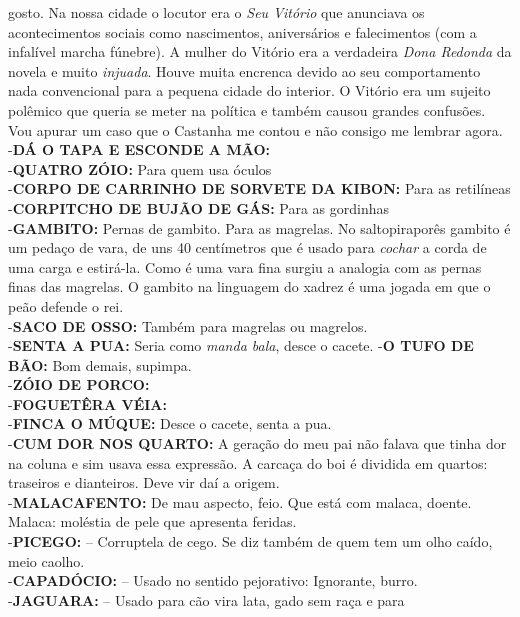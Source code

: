 \documentclass[12pt,brazil,]{book}
\begin{document}
\begin{itemize}
  gosto. Na nossa cidade o locutor era o \emph{Seu Vitório} que
  anunciava os acontecimentos sociais como nascimentos, aniversários e
  falecimentos (com a infalível marcha fúnebre). A mulher do Vitório era
  a verdadeira \emph{Dona Redonda} da novela e muito \emph{injuada}.
  Houve muita encrenca devido ao seu comportamento nada convencional
  para a pequena cidade do interior. O Vitório era um sujeito polêmico
  que queria se meter na política e também causou grandes confusões. Vou
  apurar um caso que o Castanha me contou e não consigo me lembrar
  agora.\\
  -\textbf{DÁ O TAPA E ESCONDE A MÃO:}\\
  -\textbf{QUATRO ZÓIO:} Para quem usa óculos\\
  -\textbf{CORPO DE CARRINHO DE SORVETE DA KIBON:} Para as retilíneas\\
  -\textbf{CORPITCHO DE BUJÃO DE GÁS:} Para as gordinhas\\
  -\textbf{GAMBITO:} Pernas de gambito. Para as magrelas. No
  saltopiraporês gambito é um pedaço de vara, de uns 40 centímetros que
  é usado para \emph{cochar} a corda de uma carga e estirá-la. Como é
  uma vara fina surgiu a analogia com as pernas finas das magrelas. O
  gambito na linguagem do xadrez é uma jogada em que o peão defende o
  rei.\\
  -\textbf{SACO DE OSSO:} Também para magrelas ou magrelos.\\
  -\textbf{SENTA A PUA:} Seria como \emph{manda bala}, desce o cacete.
  -\textbf{O TUFO DE BÃO:} Bom demais, supimpa.\\
  -\textbf{ZÓIO DE PORCO:}\\
  -\textbf{FOGUETÊRA VÉIA:}\\
  -\textbf{FINCA O MÚQUE:} Desce o cacete, senta a pua.\\
  -\textbf{CUM DOR NOS QUARTO:} A geração do meu pai não falava que
  tinha dor na coluna e sim usava essa expressão. A carcaça do boi é
  dividida em quartos: traseiros e dianteiros. Deve vir daí a origem.\\
  -\textbf{MALACAFENTO:} De mau aspecto, feio. Que está com malaca,
  doente. Malaca: moléstia de pele que apresenta feridas.\\
  -\textbf{PICEGO:} -- Corruptela de cego. Se diz também de quem tem um
  olho caído, meio caolho.\\
  -\textbf{CAPADÓCIO:} -- Usado no sentido pejorativo: Ignorante,
  burro.\\
  -\textbf{JAGUARA:} -- Usado para cão vira lata, gado sem raça e para

\end{itemize}
\end{document}
